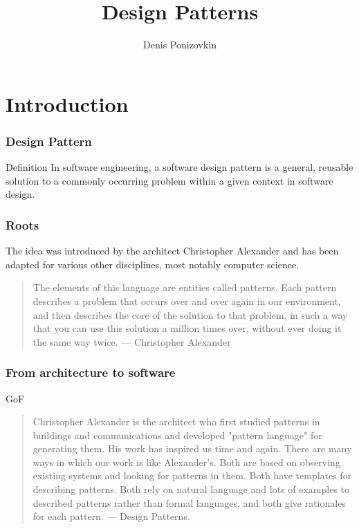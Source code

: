 \documentclass[10pt,xcolor={usenames,dvipsnames}]{beamer}
\begin{document}
\title{Design Patterns}
\author{Denis Ponizovkin} 

\institute[<EPAM>]

\frame{\titlepage} 



\section{Introduction}
\begin{frame}[fragile]
	\frametitle{Design Pattern}
	\begin{exampleblock}{Definition}
	In software engineering, a software design pattern is a general,
	reusable solution to a commonly occurring problem within a given
	context in software design.
	\end{exampleblock}
\end{frame}

\begin{frame}[fragile]
	\frametitle{Roots}
	\begin{exampleblock}{}
		The idea was introduced by the architect Christopher Alexander
		and has been adapted for various other disciplines, most notably
		computer science.
	\end{exampleblock}

	\begin{exampleblock}{}
	\begin{quote}
The elements of this language are entities called patterns. Each pattern describes a problem that occurs over and over again in our environment, and then describes the core of the solution to that problem, in such a way that you can use this solution a million times over, without ever doing it the same way twice. --- Christopher Alexander
	\end{quote}
	\end{exampleblock}
\end{frame}

\begin{frame}[fragile]
	\frametitle{From architecture to software}
	\begin{exampleblock}{GoF}
	\begin{quote}
Christopher Alexander is the architect who first studied patterns in buildings and communications and developed "pattern language" for generating them. His work has inspired us time and again. There are many ways in which our work is like Alexander's. Both are based on observing existing systems and looking for patterns in them. Both have templates for describing patterns. Both rely on natural language and lots of examples to described patterns rather than formal languages, and both give rationales for each pattern. --- Design Patterns.
	\end{quote}
	\end{exampleblock}
\end{frame}
\end{document}
